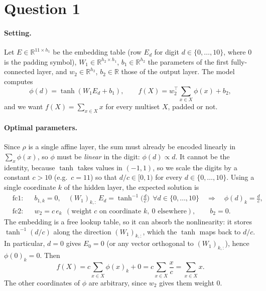 \documentclass[a4paper]{article}
\begin{document}



\section{Question 1}

\paragraph{Setting.} Let $E \in \mathbb{R}^{11 \times h_1}$ be the embedding table (row $E_d$ for digit $d \in \{0, \dots, 10\}$, where $0$ is the padding symbol), $W_1 \in \mathbb{R}^{h_2 \times h_1}$, $b_1 \in \mathbb{R}^{h_2}$ the parameters of the first fully-connected layer, and $w_2 \in \mathbb{R}^{h_2}$, $b_2 \in \mathbb{R}$ those of the output layer. The model computes
\begin{equation}
    \phi(d) = \tanh(W_1 E_d + b_1), \qquad f(X) = w_2^\top \sum_{x \in X} \phi(x) + b_2 ,
\end{equation}
and we want $f(X) = \sum_{x \in X} x$ for every multiset $X$, padded or not.

\paragraph{Optimal parameters.} Since $\rho$ is a single affine layer, the sum must already be encoded linearly in $\sum_x \phi(x)$, so $\phi$ must be \emph{linear} in the digit: $\phi(d) \propto d$. It cannot be the identity, because $\tanh$ takes values in $(-1, 1)$, so we scale the digits by a constant $c > 10$ (e.g.\ $c = 11$) so that $d/c \in [0, 1)$ for every $d \in \{0, \dots, 10\}$. Using a single coordinate $k$ of the hidden layer, the expected solution is
\begin{align}
    &\text{fc1:} && b_{1,k} = 0, \quad (W_1)_{k,:}\, E_d = \tanh^{-1}\!\Big(\frac{d}{c}\Big) \ \ \forall d \in \{0, \dots, 10\}
        \quad\Longrightarrow\quad \phi(d)_k = \frac{d}{c}, \label{eq:phi}\\
    &\text{fc2:} && w_2 = c\, e_k \ \ (\text{weight } c \text{ on coordinate } k, \ 0 \text{ elsewhere}), \qquad b_2 = 0 .
\end{align}
The embedding is a free lookup table, so it can absorb the nonlinearity: it stores $\tanh^{-1}(d/c)$ along the direction $(W_1)_{k,:}$, which the $\tanh$ maps back to $d/c$. In particular, $d = 0$ gives $E_0 = 0$ (or any vector orthogonal to $(W_1)_{k,:}$), hence $\phi(0)_k = 0$. Then
\begin{equation}
    f(X) = c \sum_{x \in X} \phi(x)_k + 0 = c \sum_{x \in X} \frac{x}{c} = \sum_{x \in X} x .
\end{equation}
The other coordinates of $\phi$ are arbitrary, since $w_2$ gives them weight $0$.
\end{document}
